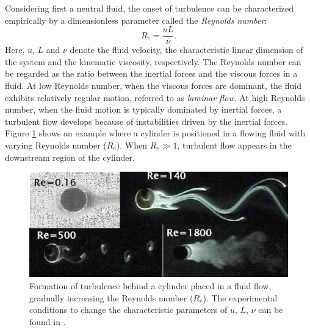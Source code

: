 Considering first a neutral fluid, the onset of turbulence can be characterized empirically by a dimensionless parameter called the \emph{Reynolds number}:%
\begin{equation}\label{eq:Reynolds_number}
  R_e=\frac{uL}{\nu}.
\end{equation}
\noindent Here, $u$, $L$ and $\nu$ denote the fluid velocity, the characteristic linear dimension of the system and the kinematic viscosity, respectively. The Reynolds number can be regarded as the ratio between the inertial forces and the viscous forces in a fluid. At low Reynolds number, when the viscous forces are dominant, the fluid exhibits relatively regular motion, referred to as \emph{laminar flow}. At high Reynolds number, when the fluid motion is typically dominated by inertial forces, a turbulent flow develops because of instabilities driven by the inertial forces. Figure \ref{fig:Reynolds_number} shows an example where a cylinder is positioned in a flowing fluid with varying Reynolds number ($R_e$). When $R_e \gg 1$, turbulent flow appears in the downstream region of the cylinder.


\begin{figure}[h]
\begin{centering}
\includegraphics[scale=0.65]{Reynolds_number.png}
\par\end{centering}
\caption[Turbulent flow around a cylinder in a fluid]{Formation of turbulence behind a cylinder placed in a fluid flow, gradually increasing the Reynolds number ($R_e$). The experimental conditions to change the characteristic parameters of $u$, $L$, $\nu$ can be found in \cite{Acheson_1990_Turbulence, Pope_2000_Turbulence}.}
\label{fig:Reynolds_number}
\end{figure}


